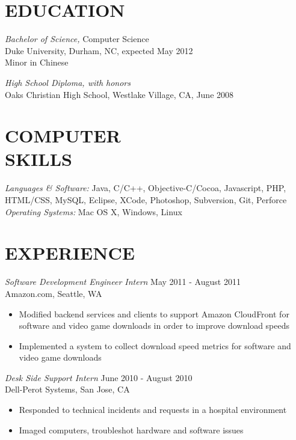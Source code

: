 \documentclass[line,margin]{res}
\begin{document}
	\setlength{\pdfpageheight}{\paperheight}
	\setlength{\pdfpagewidth}{\paperwidth}
\address{Duke University, Box 94807, Durham, NC 27708}
\address{alex@galonsky.com \hspace{.93in} REDACTED}

 
\begin{resume}
\section{EDUCATION} 
	{\sl Bachelor of Science,} Computer Science \\
    Duke University, Durham, NC, 
    expected May 2012 \\
	Minor in Chinese

	{\sl High School Diploma, with honors} \\
	Oaks Christian High School, Westlake Village, CA, June 2008
 
\section{COMPUTER \\ SKILLS} 
	{\sl Languages \& Software:} Java, C/C++, Objective-C/Cocoa, Javascript, PHP, HTML/CSS, MySQL, Eclipse, XCode, Photoshop, Subversion, Git, Perforce \\
    {\sl Operating Systems:} Mac OS X, Windows, Linux
 
\section{EXPERIENCE} 
				
	{\sl Software Development Engineer Intern} \hfill May 2011 - August 2011 \\
    	Amazon.com, Seattle, WA
        \begin{itemize}  \itemsep -2pt %
        	\item Modified backend services and clients to support Amazon CloudFront for software and video game downloads in order to improve download speeds
 			\item Implemented a system to collect download speed metrics for software and video game downloads
        \end{itemize}
				
	{\sl Desk Side Support Intern} \hfill June 2010 - August 2010 \\
        Dell-Perot Systems, San Jose, CA
        \begin{itemize}  \itemsep -2pt %
        	\item Responded to technical incidents and requests in a hospital environment
		 	\item Imaged computers, troubleshot hardware and software issues
        \end{itemize}


\end{resume}
\end{document}
